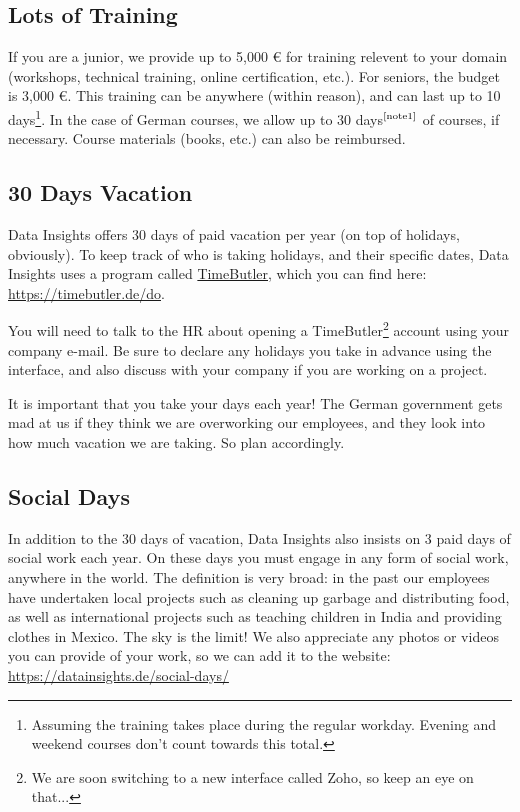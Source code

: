 \documentclass[11pt]{report}
\begin{document}
\subsection{Lots of Training}
\label{Training}
If you are a junior, we provide up to 5,000 \euro{} for training relevent to your domain (workshops, technical training, online certification, etc.). For seniors, the budget is 3,000 \euro{}. This training can be anywhere (within reason), and can last up to 10 days\footnote{\label{note1} Assuming the training takes place during the regular workday. Evening and weekend courses don't count towards this total.}. In the case of German courses, we allow up to 30 days$^{\textrm{\scriptsize \ref{note1}}}$ of courses, if necessary. Course materials (books, etc.) can also be reimbursed.

\subsection{30 Days Vacation}
\label{Vacation}
Data Insights offers 30 days of paid vacation per year (on top of holidays, obviously). To keep track of who is taking holidays, and their specific dates, Data Insights uses a program called \underline{TimeButler}, which you can find here: \href{https://timebutler.de/do}{https://timebutler.de/do}.

You will need to talk to the HR about opening a TimeButler\footnote{We are soon switching to a new interface called Zoho, so keep an eye on that...} account using your company e-mail. Be sure to declare any holidays you take in advance using the interface, and also discuss with your company if you are working on a project.

It is important that you take your days each year! The German government gets mad at us if they think we are overworking our employees, and they look into how much vacation we are taking. So plan accordingly.

\subsection{Social Days}
\label{social}
In addition to the 30 days of vacation, Data Insights also insists on 3 paid days of social work each year. On these days you must engage in any form of social work, anywhere in the world. The definition is very broad: in the past our employees have undertaken local projects such as cleaning up garbage and distributing food, as well as international projects such as teaching children in India and providing clothes in Mexico. The sky is the limit! We also appreciate any photos or videos you can provide of your work, so we can add it to the website: \href{https://datainsights.de/social-days/}{https://datainsights.de/social-days/}
\end{document}
